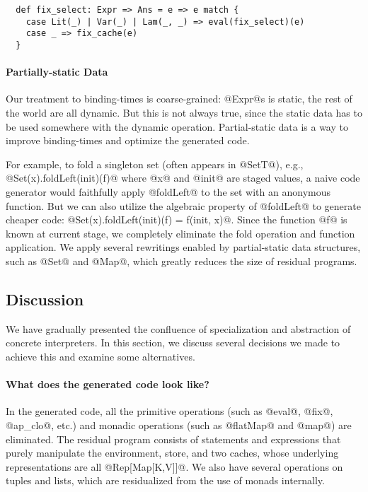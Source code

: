 \begin{lstlisting}
  def fix_select: Expr => Ans = e => e match {
    case Lit(_) | Var(_) | Lam(_, _) => eval(fix_select)(e)
    case _ => fix_cache(e)
  }
\end{lstlisting}

\paragraph{Partially-static Data}

Our treatment to binding-times is coarse-grained: @Expr@s is static, the rest of
the world are all dynamic. But this is not always true, since the static data
has to be used somewhere with the dynamic operation. Partial-static data is a
way to improve binding-times and optimize the generated code.

For example, to fold a singleton set (often appears in @SetT@), e.g.,
@Set(x).foldLeft(init)(f)@ where @x@ and @init@ are staged values, a naive code
generator would faithfully apply @foldLeft@ to the set with an anonymous
function. But we can also utilize the algebraic property of @foldLeft@ to
generate cheaper code: @Set(x).foldLeft(init)(f) = f(init, x)@. Since the
function @f@ is known at current stage, we completely eliminate the fold
operation and function application. We apply several rewritings enabled by
partial-static data structures, such as @Set@ and @Map@, which greatly reduces
the size of residual programs.


\subsection{Discussion}

We have gradually presented the confluence of specialization and abstraction of
concrete interpreters. In this section, we discuss several decisions we made to
achieve this and examine some alternatives.

\paragraph{What does the generated code look like?} In the generated code, all the
primitive operations (such as @eval@, @fix@, @ap_clo@, etc.) and monadic
operations (such as @flatMap@ and @map@) are eliminated. The residual program
consists of statements and expressions that purely manipulate the environment,
store, and two caches, whose underlying representations are all @Rep[Map[K,V]]@. We
also have several operations on tuples and lists, which are residualized from
the use of monads internally.

